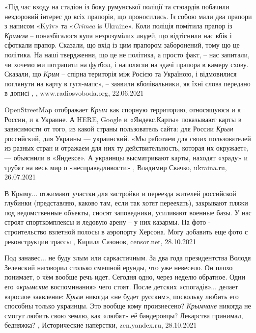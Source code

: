 «Під час входу на стадіон із боку румунської поліції та стюардів побачили
нездоровий інтерес до всіх прапорів, що проносились. Із собою мали два прапори
з написом «Kyiv» та «\emph{Crimea} is Ukraine». Коли поліція помітила прапор із
\emph{Кримом} – поназбігалося купа незрозумілих людей, що відтіснили нас вбік і
сфоткали прапор. Сказали, що вхід із цим прапором заборонений, тому що це
політика. На наші твердження, що це не політика, а просто факт, – нас запитали,
чи хочемо ми потрапити на футбол, і наполягли на здачі прапора в камеру схову.
Сказали, що \emph{Крим} – спірна територія між Росією та Україною, і відмовилися
поглянути на карту в гугл-мапс», – заявили вболівальники, як їхні слова
передано в дописі
, 
, www.radiosvoboda.org, 22.06.2021

OpenStreetMap отображает \emph{Крым} как спорную территорию, относящуюся и к России, и
к Украине. А HERE, Google и «Яндекс.Карты» показывают карты в зависимости от
того, из какой страны пользователь сайта: для России \emph{Крым} российский, для
Украины — украинский. «Мы работаем для своих пользователей из разных стран и
отражаем для них ту действительность, которая их окружает», — объяснили в
«Яндексе». А украинцы высматривают карты, находят «зраду» и трубят на весь мир
о «несправедливости»
, 
Владимир Скачко, ukraina.ru, 26.07.2021

В Крыму... отжимают участки для застройки и переезда жителей российской глубинки
(представляю, каково там, если так хотят переехать), закрывают пляжи под
ведомственные объекты, сносят заповедники, усиливают военные базы. У нас строят
спорткомплексы и ледовую арену – у них казармы. На фото - строительство
взлетной полосы в аэропорту Херсона. Могу добавить еще фото с реконструкции
трассы 
, Кирилл Сазонов, censor.net, 28.10.2021%

Под занавес...  не буду злым или саркастичным. За два года президентства Володя
Зеленский наговорил столько смешной ерунды, что уже невесело. Он плохо
понимает, о чём вообще речь идет. Сегодня одно, через неделю обратное. Одни его
«\emph{крымские} воспоминания» чего стоят.  После детских «спогадів»... делает
взрослое заявление: \emph{Крым }никогда «не будет русским», поскольку любить
его способны только украинцы. Это вообще кому произнесено? \emph{Крымчане}
никогда не смогут любить свою землю, как «любят» её бандеровцы? Лекарства
принимал, бедняжка?
, 
Исторические напёрстки, zen.yandex.ru, 28.10.2021
